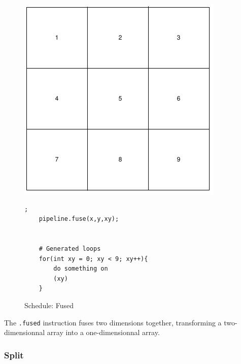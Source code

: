 \begin{figure}[H]

		\begin{minipage}[c]{\EIW}
			\centering
		\includegraphics[width=\textwidth]{Images/BaseOrder.png}
		\end{minipage}
		\begin{minipage}[c]{\ECW}
			\centering
\begin{lstlisting}[label={code:reorder}];
    pipeline.fuse(x,y,xy);


	# Generated loops
	for(int xy = 0; xy < 9; xy++){
		do something on
		(xy)
	}
\end{lstlisting}
		\end{minipage}
		\caption{Schedule: Fused}
		\label{schedule:fuse}
\end{figure}

	The \verb|.fused| instruction fuses two dimensions together, transforming a two-dimensionnal array into a one-dimensionnal array. 


\subsubsection{Split}

